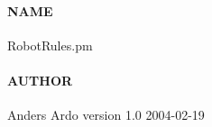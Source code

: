 \paragraph{NAME\label{NAME}}


RobotRules.pm

\paragraph{AUTHOR\label{AUTHOR}}


Anders Ardo version 1.0 2004-02-19


